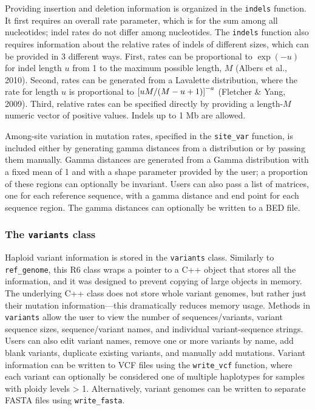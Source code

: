 \documentclass[12pt,]{article}
\let\originalleft\left
\let\originalright\right
\renewcommand{\left}{\mathopen{}\mathclose\bgroup\originalleft}
\renewcommand{\right}{\aftergroup\egroup\originalright}
\begin{document}
Providing insertion and deletion information is organized in the \texttt{indels} function.
It first requires an overall rate parameter, which is for the sum among all
nucleotides; indel rates do not differ among nucleotides.
The \texttt{indels} function also requires information about the relative rates of
indels of different sizes, which can be provided in 3 different ways.
First, rates can be proportional to \(\exp(-u)\) for indel length \(u\) from
1 to the maximum possible length, \(M\)
(Albers et al., 2010).
Second, rates can be generated from a Lavalette distribution,
where the rate for length \(u\) is proportional to
\(\left[{u M / (M - u + 1)}\right]^{-a}\)
(Fletcher \& Yang, 2009).
Third, relative rates can be specified directly by providing a length-\(M\)
numeric vector of positive values.
Indels up to 1 Mb are allowed.

Among-site variation in mutation rates, specified in the \texttt{site\_var} function,
is included either by generating gamma distances from a distribution
or by passing them manually.
Gamma distances are generated from a Gamma distribution with a fixed mean of 1
and with a shape parameter provided by the user;
a proportion of these regions can optionally be invariant.
Users can also pass a list of matrices, one for each reference sequence,
with a gamma distance and end point for each sequence region.
The gamma distances can optionally be written to a BED file.

\hypertarget{the-variants-class}{%
\subsubsection{\texorpdfstring{The \texttt{variants} class}{The variants class}}\label{the-variants-class}}

Haploid variant information is stored in the \texttt{variants} class.
Similarly to \texttt{ref\_genome}, this R6 class wraps a pointer to a C++ object
that stores all the information, and it was designed to prevent copying of large
objects in memory.
The underlying C++ class does not store whole variant genomes, but
rather just their mutation information---this dramatically reduces memory usage.
Methods in \texttt{variants} allow the user to view the number of sequences/variants,
variant sequence sizes, sequence/variant names, and individual variant-sequence strings.
Users can also edit variant names, remove one or more variants by name,
add blank variants, duplicate existing variants,
and manually add mutations.
Variant information can be written to VCF files using the \texttt{write\_vcf} function,
where each variant can optionally be considered one of multiple haplotypes for
samples with ploidy levels \textgreater{} 1.
Alternatively, variant genomes can be written to separate FASTA files
using \texttt{write\_fasta}.
\end{document}

